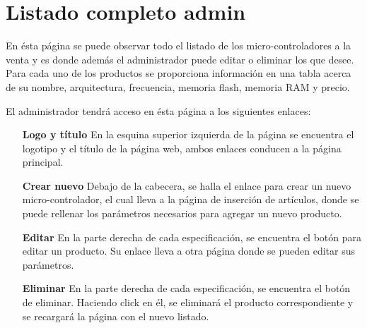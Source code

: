 \section{Listado completo admin}

En ésta página se puede observar todo el listado de los micro-controladores a la venta y es donde además el administrador puede editar o eliminar los que desee.
Para cada uno de los productos se proporciona información en una tabla acerca de su nombre, arquitectura, frecuencia, memoria flash, memoria RAM y precio.

El administrador tendrá acceso en ésta página a los siguientes enlaces:

\begin{itemize}
	\item[\textbf{Logo y título}] En la esquina superior izquierda de la página se encuentra el logotipo y el título de la página web, ambos enlaces conducen a la página principal.

	\item[\textbf{Crear nuevo}] Debajo de la cabecera, se halla el enlace para crear un nuevo micro-controlador, el cual lleva a la página de inserción de artículos, donde se puede rellenar los parámetros necesarios para agregar un nuevo producto.
	
	\item[\textbf{Editar}] En la parte derecha de cada especificación, se encuentra el botón para editar un producto. Su enlace lleva a otra página donde se pueden editar sus parámetros.
	
	\item[\textbf{Eliminar}] En la parte derecha de cada especificación, se encuentra el botón de eliminar. Haciendo click en él, se eliminará el producto correspondiente y se recargará la página con el nuevo listado.
\end{itemize}